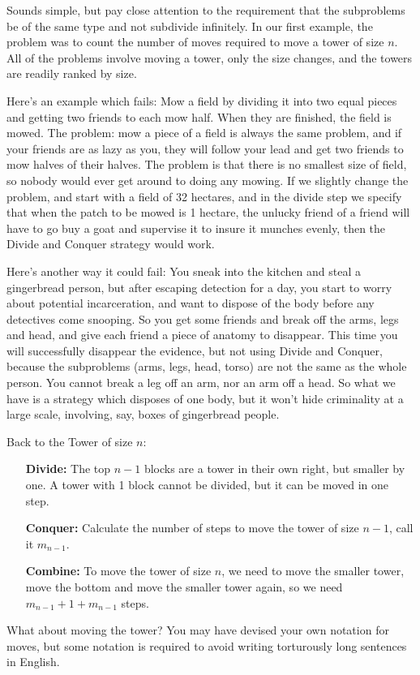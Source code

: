 \documentclass[12pt]{amsbook}
\begin{document}
Sounds simple, but pay close attention to the requirement that the subproblems be of the same type and not subdivide infinitely.  In our first example, the problem was to count the number of moves required to move a tower of size $n$.  All of the problems involve moving a tower, only the size changes, and the towers are readily ranked by size.

Here's an example which fails:  Mow a field by dividing it into two equal pieces and getting two friends to each mow half.  When they are finished, the field is mowed.  The problem:  mow a piece of a field is always the same problem, and if your friends are as lazy as you, they will follow your lead and get two friends to mow halves of their halves.  The problem is that there is no smallest size of field, so nobody would ever get around to doing any mowing.  If we slightly change the problem, and start with a field of 32 hectares, and in the divide step we specify that when the patch to be mowed is 1 hectare, the unlucky friend of a friend will have to go buy a goat and supervise it to insure it munches evenly, then the Divide and Conquer strategy would work.

Here's another way it could fail:  You sneak into the kitchen and steal a gingerbread person, but after escaping detection for a day, you start to worry about potential incarceration, and want to dispose of the body before any detectives come snooping.  So you get some friends and break off the arms, legs and head, and give each friend a piece of anatomy to disappear.  This time you will successfully disappear the evidence, but not using Divide and Conquer, because the subproblems (arms, legs, head, torso) are not the same as the whole person.  You cannot break a leg off an arm, nor an arm off a head.  So what we have is a strategy which disposes of one body, but it won't hide criminality at a large scale, involving, say, boxes of gingerbread people.

Back to the Tower of size $n$:

\begin{itemize}
\item[\textbf{Divide:}]  
The top $n-1$ blocks are a tower in their own right, but smaller by one.  A tower with 1 block cannot be divided, but it can be moved in one step.
\item[\textbf{Conquer:}]  
Calculate the number of steps to move the tower of size $n-1$, call it $m_{n-1}$.
\item[\textbf{Combine:}]  
To move the tower of size $n$, we need to move the smaller tower, move the bottom and move the smaller tower again, so we need $m_{n-1} + 1 + m_{n-1}$ steps.
\end{itemize}
What about moving the tower?  You may have devised your own notation for moves, but some notation is required to avoid writing torturously long sentences in English.
\end{document}
